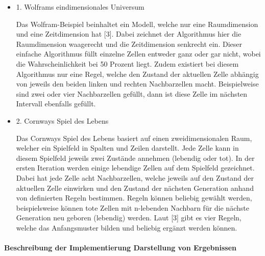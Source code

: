 \documentclass[../mciAusarbeitung.tex]{subfiles}
\begin{document}
            \begin{itemize}
 \item 1.	Wolframs eindimensionales Universum
            
            Das Wolfram-Beispiel beinhaltet ein Modell, welche nur eine Raumdimension und eine Zeitdimension hat [3]. Dabei zeichnet der Algorithmus hier die Raumdimension waagerecht und die Zeitdimension senkrecht ein. Dieser einfache Algorithmus füllt einzelne Zellen entweder ganz oder gar nicht, wobei die Wahrscheinlichkeit bei 50 Prozent liegt. Zudem existiert bei diesem Algorithmus nur eine Regel, welche den Zustand der aktuellen Zelle abhängig von jeweils den beiden linken und rechten Nachbarzellen macht. Beispielweise sind zwei oder vier Nachbarzellen gefüllt, dann ist diese Zelle im nächsten Intervall ebenfalls gefüllt.
 \item 2.	Cornways Spiel des Lebens
            
            Das Cornways Spiel des Lebens basiert auf einen zweidimensionalen Raum, welcher ein Spielfeld in Spalten und Zeilen darstellt. Jede Zelle kann in diesem Spielfeld jeweils zwei Zustände annehmen (lebendig oder tot). In der ersten Iteration werden einige lebendige Zellen auf dem Spielfeld gezeichnet. Dabei hat jede Zelle acht Nachbarzellen, welche jeweils auf den Zustand der aktuellen Zelle einwirken und den Zustand der nächsten Generation anhand von definierten Regeln bestimmen. Regeln können beliebig gewählt werden, beispielsweise können tote Zellen mit n-lebenden Nachbarn für die nächste Generation neu geboren (lebendig) werden.  Laut [3] gibt es vier Regeln, welche das Anfangsmuster bilden und beliebig ergänzt werden können.
\end{itemize}
            
            \paragraph{Beschreibung der Implementierung Darstellung von Ergebnissen}$~$ \\
            
\end{document}
